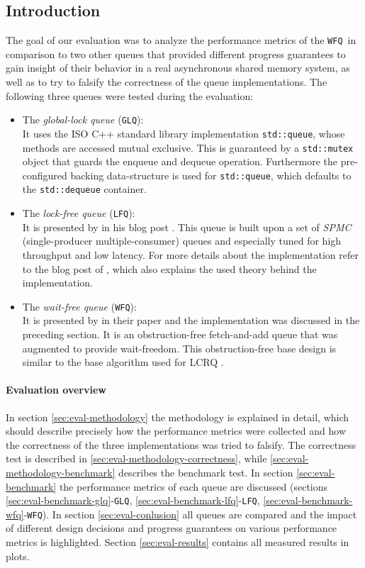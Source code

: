 \documentclass{article}
\newcommand{\GLQ}{\texttt{GLQ}}
\newcommand{\LFQ}{\texttt{LFQ}}
\newcommand{\WFQ}{\texttt{WFQ}}
\begin{document}
\subsection{Introduction\label{sec:eval-intro}}
The goal of our evaluation was to analyze the performance metrics of the \WFQ~in comparison to two other queues that provided different progress guarantees to gain insight of their behavior in a real asynchronous shared memory system, as well as to try to falsify the correctness of the queue implementations. The following three queues were tested during the evaluation:
\begin{itemize}
    \item The \emph{global-lock queue} (\GLQ):\\It uses the ISO C++ standard library implementation \texttt{std::queue}, whose methods are accessed mutual exclusive. This is guaranteed by a \texttt{std::mutex} object that guards the enqueue and dequeue operation. Furthermore the pre-configured backing data-structure is used for \texttt{std::queue}, which defaults to the \texttt{std::dequeue} container.
    \item The \emph{lock-free queue} (\LFQ):\\It is presented by \citeauthor{LFQ} in his blog post \cite{LFQ}. This queue is built upon a set of \emph{SPMC} (single-producer multiple-consumer) queues and especially tuned for high throughput and low latency. For more details about the implementation refer to the blog post \cite{LFQEXPL} of \citeauthor{LFQEXPL}, which also explains the used theory behind the implementation.
    \item The \emph{wait-free queue} (\WFQ):\\It is presented by \citeauthor{WFQ} \cite{WFQ} in their paper and the implementation was discussed in the preceding section. It is an obstruction-free fetch-and-add queue that was augmented to provide wait-freedom. This obstruction-free base design is similar to the base algorithm used for LCRQ \cite{MA13}.
\end{itemize}

\paragraph{Evaluation overview}
In section \ref{sec:eval-methodology} the methodology is explained in detail, which should describe precisely how the performance metrics were collected and how the correctness of the three implementations was tried to falsify. The correctness test is described in \ref{sec:eval-methodology-correctness}, while \ref{sec:eval-methodology-benchmark} describes the benchmark test. In section \ref{sec:eval-benchmark} the performance metrics of each queue are discussed (sections \ref{sec:eval-benchmark-glq}-\GLQ, \ref{sec:eval-benchmark-lfq}-\LFQ, \ref{sec:eval-benchmark-wfq}-\WFQ). In section \ref{sec:eval-conlusion} all queues are compared and the impact of different design decisions and progress guarantees on various performance metrics is highlighted. Section \ref{sec:eval-results} contains all measured results in plots.
\clearpage
\end{document}
